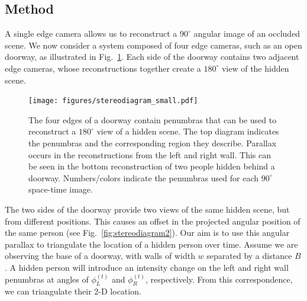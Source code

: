 

\subsection{Method}


A single edge camera allows us to reconstruct
a $90^{\circ}$ angular image of an occluded scene. We now consider a system composed
of four edge cameras, such as an open doorway, as illustrated in Fig.~\ref{fig:stereodiagram1}. Each side of the doorway contains two adjacent edge cameras, whose reconstructions
together create a $180^{\circ}$ view of the hidden scene. 

\begin{figure}[tb]
\centering
\texttt{[image: figures/stereodiagram\_small.pdf]}
\vspace{-.2in}
\caption{The four edges of a doorway contain penumbras that can be used to reconstruct a $180^{\circ}$ view of a hidden scene. The top diagram indicates the penumbras and the corresponding region they describe. 
Parallax occurs in the reconstructions from the left and right wall. This can be seen in the bottom reconstruction of two people hidden behind a doorway. Numbers/colors indicate the penumbras used for each $90^{\circ}$ space-time image.
\label{fig:stereodiagram1}}
\vspace{-.2in}
\end{figure}

The two sides of the doorway provide two views of the same hidden scene, but from different positions. This causes an offset in the projected angular position of the same person (see Fig.~\ref{fig:stereodiagram2}).
Our aim is to use this angular parallax to triangulate the location of a hidden person over time. 
Assume we are observing the base of a doorway, with walls of width $w$ separated by a distance $B$. 
A hidden person will introduce an intensity change on the left and right wall penumbras at angles of $\phi^{(t)}_L$ and $\phi^{(t)}_R$, respectively. 
From this correspondence, we can triangulate their 2-D location.




